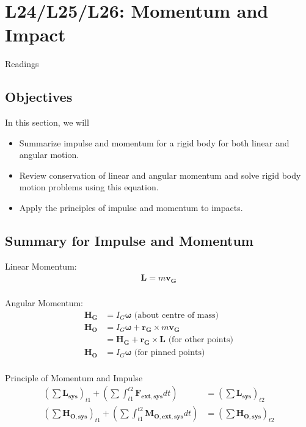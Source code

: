 \documentclass[12pt,letterpaper,twoside]{report}
\begin{document}
\chapter{L24/L25/L26: Momentum and Impact}
Readings

\section{Objectives}
In this section, we will 
\begin{itemize}
\item Summarize impulse and momentum for a rigid body for both linear and angular motion.
\item Review conservation of linear and angular momentum and solve rigid body motion problems using this equation.
\item Apply the principles of impulse and momentum to impacts.
\end{itemize}

\section{Summary for Impulse and Momentum}
\begin{minipage}[t]{0.5\textwidth}
Linear Momentum:
\begin{align*}
\bm{L} = m \bm{v_G}\\
\end{align*}
\end{minipage}
\begin{minipage}[t]{0.5\textwidth}
Angular Momentum:
\begin{align*}
\bm{H_G} &= I_G \bm{\omega} \text{ (about centre of mass)}\\
\bm{H_O} &= I_G \bm{\omega} + \bm{r_G} \times m \bm{v_G} \\
&= \bm{H_G} + \bm{r_G} \times \bm{L} \text{ (for other points)}\\
\bm{H_O} &= I_G \bm{\omega} \text{ (for pinned points)}\\
\end{align*}
\end{minipage}

Principle of Momentum and Impulse
\begin{align*}
\left(\sum \bm{L_{sys}} \right)_{t1} + \left( \sum \int_{t1}^{t2} \bm{F_{ext,sys}} dt \right) &= \left(\sum \bm{L_{sys}} \right)_{t2} \\
\left(\sum \bm{H_{O,sys}} \right)_{t1} + \left( \sum \int_{t1}^{t2} \bm{M_{O,ext,sys}} dt \right) &= \left(\sum \bm{H_{O,sys}} \right)_{t2} \\
\end{align*}
\end{document}
